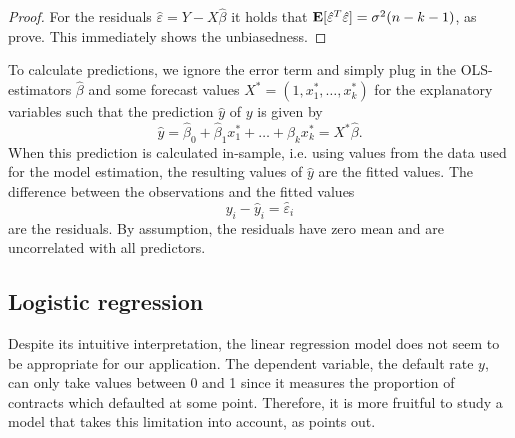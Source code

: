 \documentclass[a4paper, 12pt]{scrreprt}
\newcommand{\ew}{\mbox{\textbf{E}}}
\begin{document}
\begin{proof}
For the residuals $\hat{\varepsilon} = Y - X\hat{\beta}$ it holds that $\ew[\hat{\varepsilon}^T \hat{\varepsilon}] = \sigma^2 (n-k-1)$, as \textcite[eq. (2.1.12)]{judgei1985econometrics} prove. This immediately shows the unbiasedness.
\end{proof}

To calculate predictions, we ignore the error term and simply plug in the OLS-estimators $\hat{\beta}$ and some forecast values $X^* = (1, x_1^*, \ldots, x_k^*)$ for the explanatory variables such that the prediction $\hat{y}$ of $y$ is given by
\begin{equation}
\hat{y} = \hat{\beta}_0 + \hat{\beta}_1 x_1^* + \ldots + \hat{\beta}_k x_k^* = X^* \hat{\beta}.
\end{equation}
When this prediction is calculated in-sample, i.e. using values from the data used for the model estimation, the resulting values of $\hat{y}$ are the fitted values. The difference between the observations and the fitted values 
\begin{equation}
y_i - \hat{y}_i = \hat{\varepsilon}_i
\end{equation}
are the residuals. By assumption, the residuals have zero mean and are uncorrelated with all predictors.


\subsection{Logistic regression}\label{par:logisticregression}

Despite its intuitive interpretation, the linear regression model does not seem to be appropriate for our application. The dependent variable, the default rate $y$, can only take values between 0 and 1 since it measures the proportion of contracts which defaulted at some point. Therefore, it is more fruitful to study a model that takes this limitation into account, as \textcite[chapter 4]{agresti1996introduction} points out.
\end{document}

